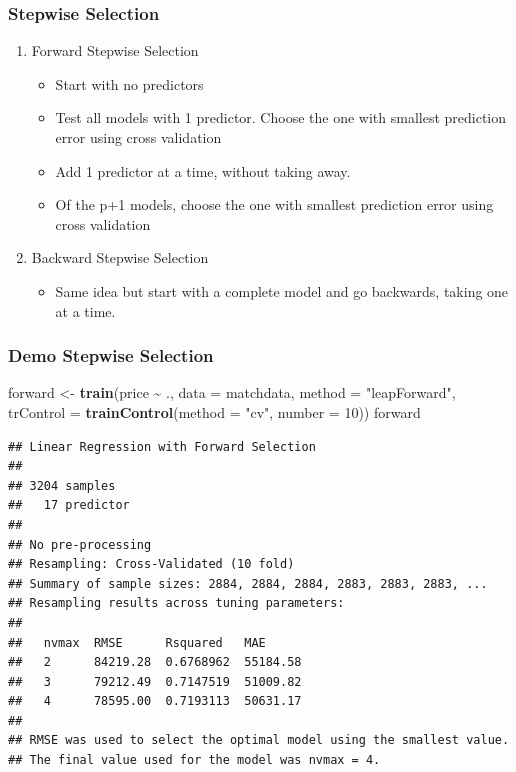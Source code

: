 \documentclass[
  shownotes,
  xcolor={svgnames},
  hyperref={colorlinks,citecolor=DarkBlue,linkcolor=DarkRed,urlcolor=DarkBlue}
  , aspectratio=169]{beamer}
\newenvironment{Shaded}{\begin{snugshade}}{\end{snugshade}}
\newcommand{\DataTypeTok}[1]{\textcolor[rgb]{0.13,0.29,0.53}{#1}}
\newcommand{\DecValTok}[1]{\textcolor[rgb]{0.00,0.00,0.81}{#1}}
\newcommand{\KeywordTok}[1]{\textcolor[rgb]{0.13,0.29,0.53}{\textbf{#1}}}
\newcommand{\NormalTok}[1]{#1}
\newcommand{\OperatorTok}[1]{\textcolor[rgb]{0.81,0.36,0.00}{\textbf{#1}}}
\newcommand{\StringTok}[1]{\textcolor[rgb]{0.31,0.60,0.02}{#1}}
\begin{document}
\begin{frame}[fragile]
\frametitle{Stepwise Selection}
 
 \begin{enumerate}
 \item Forward Stepwise Selection
 \begin{itemize}
\item Start with no predictors
\medskip
\item Test all models with 1 predictor. Choose the one with smallest prediction error using cross validation
\medskip
\item Add 1 predictor at a time, without taking away. 
\medskip
\item Of the p+1 models, choose the one with smallest prediction error using cross validation
\end{itemize}
\item  Backward Stepwise Selection
\begin{itemize}
  \item Same idea but start with a complete model and go backwards, taking one at a time. 
  \end{itemize}
\end{enumerate}
\end{frame}
\begin{frame}[fragile]
\frametitle{Demo Stepwise Selection}

\begin{scriptsize}
\begin{Shaded}
\begin{Highlighting}[]
\NormalTok{forward \textless{}{-}}\StringTok{ }\KeywordTok{train}\NormalTok{(price }\OperatorTok{\textasciitilde{}}\StringTok{ }\NormalTok{., }\DataTypeTok{data =}\NormalTok{ matchdata,}
              \DataTypeTok{method =} \StringTok{"leapForward"}\NormalTok{,}
              \DataTypeTok{trControl =} \KeywordTok{trainControl}\NormalTok{(}\DataTypeTok{method =} \StringTok{"cv"}\NormalTok{, }\DataTypeTok{number =} \DecValTok{10}\NormalTok{))}
\NormalTok{forward}
\end{Highlighting}
\end{Shaded}
\end{scriptsize}
\begin{tiny}
\begin{verbatim}
## Linear Regression with Forward Selection 
## 
## 3204 samples
##   17 predictor
## 
## No pre-processing
## Resampling: Cross-Validated (10 fold) 
## Summary of sample sizes: 2884, 2884, 2884, 2883, 2883, 2883, ... 
## Resampling results across tuning parameters:
## 
##   nvmax  RMSE      Rsquared   MAE     
##   2      84219.28  0.6768962  55184.58
##   3      79212.49  0.7147519  51009.82
##   4      78595.00  0.7193113  50631.17
## 
## RMSE was used to select the optimal model using the smallest value.
## The final value used for the model was nvmax = 4.
\end{verbatim}
\end{tiny}


\end{frame}
\end{document}
